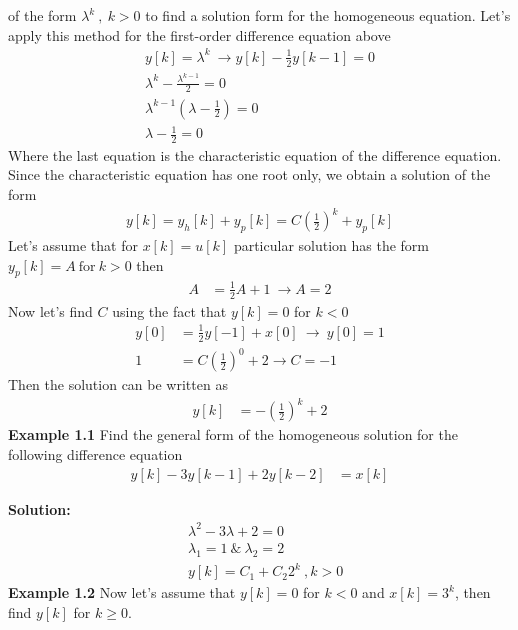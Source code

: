 \documentclass[twoside]{article}
\begin{document}
of the form $\lambda^k \ , \ k >0$ to find a solution form for the
homogeneous equation. Let's apply this method for the first-order
difference equation above
%
\begin{align*}
y[k] = \lambda^k \ \rightarrow y[k] - \frac{1}{2} y[k-1] = 0 \\
\lambda^k - \frac{\lambda^{k-1}}{2} = 0 \\
\lambda^{k-1} \left( \lambda - \frac{1}{2}  \right) = 0 \\
\lambda - \frac{1}{2} = 0
\end{align*}
%
Where the last equation is the characteristic equation of the difference
equation. Since the characteristic equation has one root only, we
obtain a solution of the form
%
\begin{align*}
y[k] = y_h[k] + y_p[k] = C \left( \frac{1}{2} \right)^k + y_p[k]
\end{align*}
%
Let's assume that for $x[k] = u[k]$ particular solution has the 
form $y_p[k] = A \ \mathrm{for} \ k > 0$ then
%
\begin{align*}
A &= \frac{1}{2} A + 1 \ \rightarrow A = 2
\end{align*}
%
Now let's find $C$ using the fact that $y[k] = 0$ for $k<0$
%
\begin{align*}
y[0] &= \frac{1}{2} y[-1] + x[0] \ \rightarrow \  y[0] = 1
\\
1 &= C \left( \frac{1}{2} \right)^0 + 2 \rightarrow  C = -1
\end{align*}
%
Then the solution can be written as
%
\begin{align*}
  y[k] &= -\left( \frac{1}{2} \right)^k + 2
\end{align*}
%
\textbf{Example 1.1} Find the general form of the homogeneous solution
for the following difference equation
%
\begin{align*}
  y[k] - 3 y[k-1] + 2 y[k-2] &= x[k]
\end{align*}

\textbf{Solution:}
%
\begin{align*}
&\lambda^2 - 3 \lambda + 2 = 0
\\
&\lambda_1 = 1 \ \& \ \lambda_2 = 2 
\\
&y[k] = C_1 + C_2 2^k \ , k > 0 
\end{align*}
%
\textbf{Example 1.2} Now let's assume that $y[k] = 0$ for $k<0$
and $x[k] = 3^k$, then find $y[k]$ for $k \geq 0$.
\end{document}
